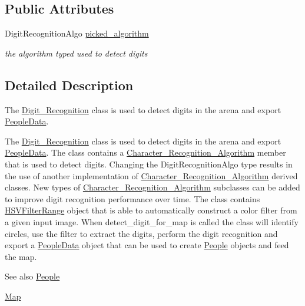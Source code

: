 \subsection*{Public Attributes}
\begin{DoxyCompactItemize}
\item 
\mbox{\label{class_digit___recognition_aae57bd40fa8864ed5085beb98aa22fcd}} 
Digit\+Recognition\+Algo \mbox{\hyperlink{class_digit___recognition_aae57bd40fa8864ed5085beb98aa22fcd}{picked\+\_\+algorithm}}
\begin{DoxyCompactList}\small\item\em the algorithm typed used to detect digits \end{DoxyCompactList}\end{DoxyCompactItemize}


\subsection{Detailed Description}
The \mbox{\hyperlink{class_digit___recognition}{Digit\+\_\+\+Recognition}} class is used to detect digits in the arena and export \mbox{\hyperlink{struct_people_data}{People\+Data}}. 

The \mbox{\hyperlink{class_digit___recognition}{Digit\+\_\+\+Recognition}} class is used to detect digits in the arena and export \mbox{\hyperlink{struct_people_data}{People\+Data}}. The class contains a \mbox{\hyperlink{class_character___recognition___algorithm}{Character\+\_\+\+Recognition\+\_\+\+Algorithm}} member that is used to detect digits. Changing the Digit\+Recognition\+Algo type results in the use of another implementation of \mbox{\hyperlink{class_character___recognition___algorithm}{Character\+\_\+\+Recognition\+\_\+\+Algorithm}} derived classes. New types of \mbox{\hyperlink{class_character___recognition___algorithm}{Character\+\_\+\+Recognition\+\_\+\+Algorithm}} subclasses can be added to improve digit recognition performance over time. The class contains \mbox{\hyperlink{struct_h_s_v_filter_range}{H\+S\+V\+Filter\+Range}} object that is able to automatically construct a color filter from a given input image. When detect\+\_\+digit\+\_\+for\+\_\+map is called the class will identify circles, use the filter to extract the digits, perform the digit recognition and export a \mbox{\hyperlink{struct_people_data}{People\+Data}} object that can be used to create \mbox{\hyperlink{class_people}{People}} objects and feed the map. \begin{DoxySeeAlso}{See also}
\mbox{\hyperlink{class_people}{People}} 

\mbox{\hyperlink{class_map}{Map}} 
\end{DoxySeeAlso}


